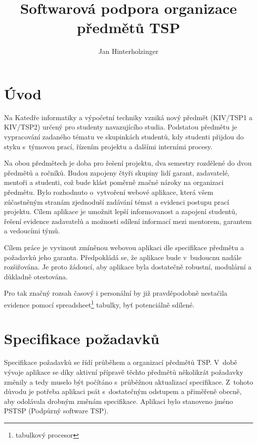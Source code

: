\documentclass[czech,BP]{thesiskiv}
\author{Jan Hinterholzinger}
\title{Softwarová podpora organizace předmětů TSP}
\begin{document}
%
\maketitle
\tableofcontents
\chapter{Úvod}
	\par Na Katedře informatiky a výpočetní techniky vzniká nový předmět  (KIV/TSP1 a KIV/TSP2) určený pro studenty navazujícího studia. Podstatou předmětu je vypracování zadaného tématu ve skupinkách studentů, kdy studenti přijdou do styku s~týmovou prací, řízením projektu a dalšími interními procesy.
	\par Na obou předmětech je doba pro řešení projektu, dva semestry rozdělené do dvou předmětů a ročníků. Budou zapojeny čtyři skupiny lidí garant, zadavatelé, mentoři a studenti, což bude klást poměrně značné nároky na organizaci předmětu. Bylo rozhodnuto o~vytvoření webové aplikace, která všem zúčastněným stranám zjednoduší zadávání témat a evidenci postupu prací projektu. Cílem aplikace je umožnit lepší informovanost a zapojení studentů, řešení evidence zadavatelů a možnosti sdílení informací mezi mentorem, garantem a vedoucími týmů.
	\par Cílem práce je vyvinout zmíněnou webovou aplikaci dle specifikace předmětu a požadavků jeho garanta. Předpokládá se, že aplikace bude v~budoucnu nadále rozšiřována. Je proto žádoucí, aby aplikace byla dostatečně robustní, modulární a důkladně otestována.
	\par Pro tak značný rozsah časový i personální by již pravděpodobně nestačila evidence pomocí spreadsheet\footnote{tabulkový procesor} tabulky, byť potenciálně sdílené.
\chapter{Specifikace požadavků}
\par Specifikace požadavků se řídí průběhem a organizací předmětů TSP. V~době vývoje aplikace se díky aktivní přípravě těchto předmětů několikrát požadavky změnily a tedy muselo být počítáno s~průběžnou aktualizací specifikace. Z~tohoto důvodu je potřeba aplikaci psát s~dostatečným odstupem a přiměřeně obecně, aby odolávala drobným změnám specifikace. Aplikaci bylo stanoveno jméno PSTSP (Podpůrný software TSP).
\end{document}
